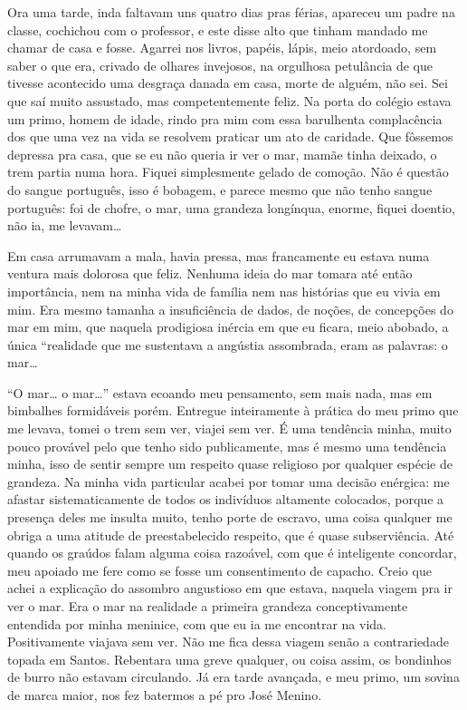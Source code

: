 Ora uma tarde, inda faltavam uns quatro dias pras férias, apareceu um
padre na classe, cochichou com o professor, e este disse alto que tinham
mandado me chamar de casa e fosse. Agarrei nos livros, papéis, lápis,
meio atordoado, sem saber o que era, crivado de olhares invejosos, na
orgulhosa petulância de que tivesse acontecido uma desgraça danada em
casa, morte de alguém, não sei. Sei que saí muito assustado, mas
competentemente feliz. Na porta do colégio estava um primo, homem de
idade, rindo pra mim com essa barulhenta complacência dos que uma vez na
vida se resolvem praticar um ato de caridade. Que fôssemos depressa pra
casa, que se eu não queria ir ver o mar, mamãe tinha deixado, o trem
partia numa hora. Fiquei simplesmente gelado de comoção. Não é questão
do sangue português, isso é bobagem, e parece mesmo que não tenho sangue
português: foi de chofre, o mar, uma grandeza longínqua, enorme, fiquei
doentio, não ia, me levavam\ldots{}

Em casa arrumavam a mala, havia pressa, mas francamente eu estava numa
ventura mais dolorosa que feliz. Nenhuma ideia do mar tomara até então
importância, nem na minha vida de família nem nas histórias que eu vivia
em mim. Era mesmo tamanha a insuficiência de dados, de noções, de
concepções do mar em mim, que naquela prodigiosa inércia em que eu
ficara, meio abobado, a única ``realidade que me sustentava a angústia
assombrada, eram as palavras: o mar\ldots{}

``O mar\ldots{} o mar\ldots{}'' estava ecoando meu pensamento, sem mais nada, mas
em bimbalhes formidáveis porém. Entregue inteiramente à prática do meu
primo que me levava, tomei o trem sem ver, viajei sem ver. É uma
tendência minha, muito pouco provável pelo que tenho sido publicamente,
mas é mesmo uma tendência minha, isso de sentir sempre um respeito quase
religioso por qualquer espécie de grandeza. Na minha vida particular
acabei por tomar uma decisão enérgica: me afastar sistematicamente de
todos os indivíduos altamente colocados, porque a presença deles me
insulta muito, tenho porte de escravo, uma coisa qualquer me obriga a
uma atitude de preestabelecido respeito, que é quase subserviência. Até
quando os graúdos falam alguma coisa razoável, com que é inteligente
concordar, meu apoiado me fere como se fosse um consentimento de
capacho. Creio que achei a explicação do assombro angustioso em que
estava, naquela viagem pra ir ver o mar. Era o mar na realidade a
primeira grandeza conceptivamente entendida por minha meninice, com que
eu ia me encontrar na vida. Positivamente viajava sem ver. Não me fica
dessa viagem senão a contrariedade topada em Santos. Rebentara uma greve
qualquer, ou coisa assim, os bondinhos de burro não estavam circulando.
Já era tarde avançada, e meu primo, um sovina de marca maior, nos fez
batermos a pé pro José Menino.


